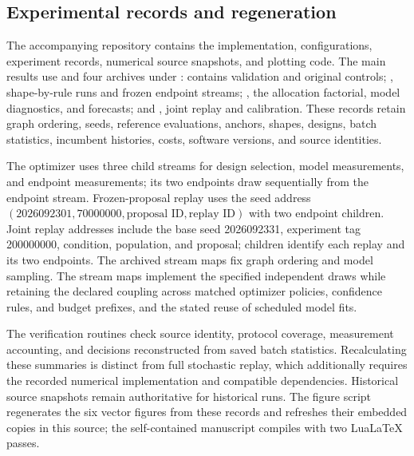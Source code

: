 \documentclass[11pt]{article}
\begin{document}
\subsection{Experimental records and regeneration}
\label{sec:availability}
The accompanying repository contains the implementation, configurations,
experiment records, numerical source snapshots, and plotting code.
The main results use  and four archives
under :  contains validation and
original controls; , shape-by-rule runs and frozen
endpoint streams; , the allocation factorial,
model diagnostics, and forecasts; and , joint replay
and calibration. These records retain graph ordering, seeds, reference
evaluations, anchors, shapes, designs, batch statistics, incumbent histories,
costs, software versions, and source identities.

The optimizer uses three child streams for design selection, model
measurements, and endpoint measurements; its two endpoints draw sequentially
from the endpoint stream. Frozen-proposal replay uses the seed address
$(2026092301,70000000,\text{proposal ID},\text{replay ID})$ with two
endpoint children. Joint replay addresses include the base seed
2026092331, experiment tag 200000000, condition, population, and proposal;
children identify each replay and its two endpoints. The archived stream
maps fix graph ordering and model sampling. The stream maps implement the specified independent draws while retaining
the declared coupling across matched optimizer policies, confidence rules,
and budget prefixes, and the stated reuse of scheduled model fits.

The verification routines check source identity, protocol coverage,
measurement accounting, and decisions reconstructed from saved batch
statistics. Recalculating these summaries is distinct from full stochastic
replay, which additionally requires the recorded numerical implementation
and compatible dependencies. Historical source snapshots remain authoritative
for historical runs. The figure script regenerates the six vector figures
from these records and refreshes their embedded copies in this source;
the self-contained manuscript compiles with two LuaLaTeX passes.
\end{document}
